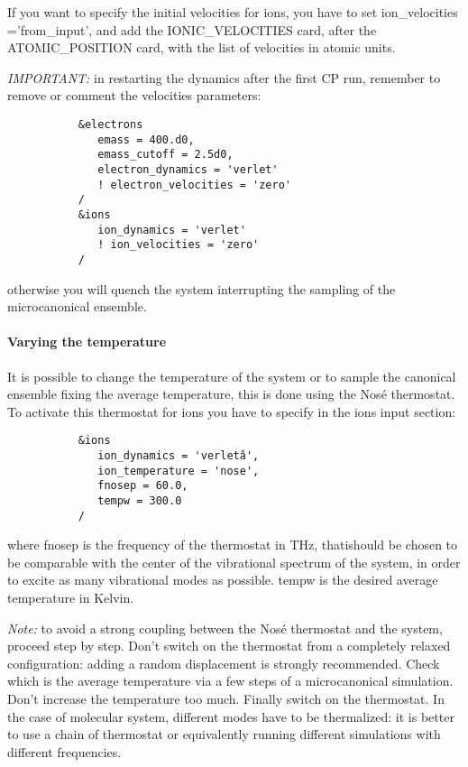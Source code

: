 \documentclass[12pt,a4paper]{article}
\begin{document}
If you want to specify the initial velocities for ions, you have to set
ion\_velocities ='from\_input', and add the IONIC\_VELOCITIES
card, after the ATOMIC\_POSITION card, with the list of velocities in 
atomic units.

{\em IMPORTANT:} in restarting the dynamics after the first CP run,
remember to remove or comment the velocities parameters:
\begin{verbatim}
           &electrons
              emass = 400.d0,
              emass_cutoff = 2.5d0,
              electron_dynamics = 'verlet'
              ! electron_velocities = 'zero'
           /
           &ions
              ion_dynamics = 'verlet'
              ! ion_velocities = 'zero'
           /
\end{verbatim}
otherwise you will quench the system interrupting the sampling of the
microcanonical ensemble.

\paragraph{ Varying the temperature }
   
It is possible to change the temperature of the system or to sample the 
canonical ensemble fixing the average temperature, this is done using 
the Nos\'e thermostat. To activate this thermostat for ions you have 
to specify in the ions input section:
\begin{verbatim}
           &ions
              ion_dynamics = 'verletâ',
              ion_temperature = 'nose',
              fnosep = 60.0,
              tempw = 300.0
           /  
\end{verbatim}
where fnosep is the frequency of the thermostat in THz, thatishould be
chosen to be comparable with the center of the vibrational spectrum of
the system, in order to excite as many vibrational modes as possible.
tempw is the desired average temperature in Kelvin.
   
{\em Note:} to avoid a strong coupling between the Nos\'e thermostat 
and the system, proceed step by step. Don't switch on the thermostat 
from a completely relaxed configuration: adding a random displacement
is strongly recommended. Check which is the average temperature via a
few steps of a microcanonical simulation. Don't increase the temperature
too much. Finally switch on the thermostat. In the case of molecular system,
different modes have to be thermalized: it is better to use a chain of 
thermostat or equivalently running different simulations with different 
frequencies. 
 
\end{document}
